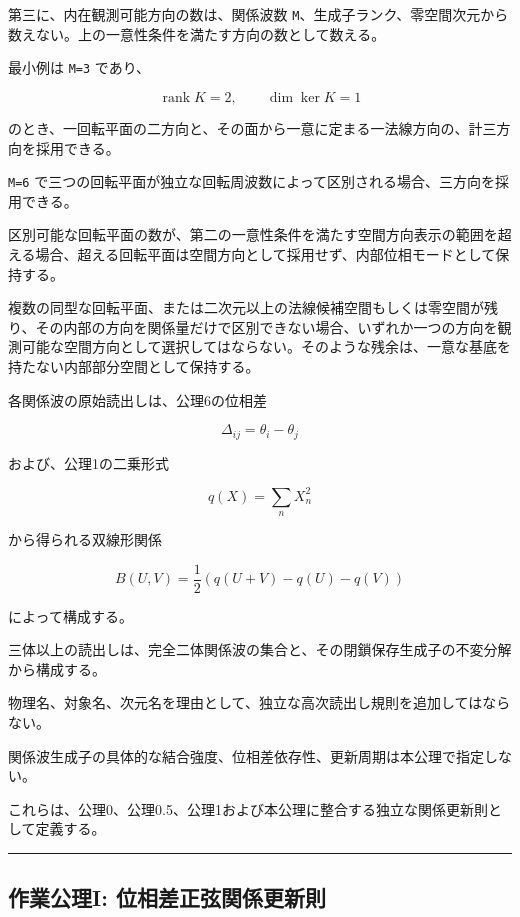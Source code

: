 \documentclass[
  a4paper,
]{ltjsarticle}
\begin{document}
第三に、内在観測可能方向の数は、関係波数
\texttt{M}、生成子ランク、零空間次元から数えない。上の一意性条件を満たす方向の数として数える。

最小例は \texttt{M=3} であり、

\[
\operatorname{rank}K=2,
\qquad
\dim\ker K=1
\]

のとき、一回転平面の二方向と、その面から一意に定まる一法線方向の、計三方向を採用できる。

\texttt{M=6}
で三つの回転平面が独立な回転周波数によって区別される場合、三方向を採用できる。

区別可能な回転平面の数が、第二の一意性条件を満たす空間方向表示の範囲を超える場合、超える回転平面は空間方向として採用せず、内部位相モードとして保持する。

複数の同型な回転平面、または二次元以上の法線候補空間もしくは零空間が残り、その内部の方向を関係量だけで区別できない場合、いずれか一つの方向を観測可能な空間方向として選択してはならない。そのような残余は、一意な基底を持たない内部部分空間として保持する。

各関係波の原始読出しは、公理6の位相差

\[
\Delta_{ij}=\theta_i-\theta_j
\]

および、公理1の二乗形式

\[
q(X)=\sum_n X_n^2
\]

から得られる双線形関係

\[
B(U,V)
=\frac{1}{2}\left(q(U+V)-q(U)-q(V)\right)
\]

によって構成する。

三体以上の読出しは、完全二体関係波の集合と、その閉鎖保存生成子の不変分解から構成する。

物理名、対象名、次元名を理由として、独立な高次読出し規則を追加してはならない。

関係波生成子の具体的な結合強度、位相差依存性、更新周期は本公理で指定しない。

これらは、公理0、公理0.5、公理1および本公理に整合する独立な関係更新則として定義する。

\begin{center}\rule{0.5\linewidth}{0.5pt}\end{center}

\subsection{作業公理I:
位相差正弦関係更新則}\label{ux4f5cux696dux516cux7406i-ux4f4dux76f8ux5deeux6b63ux5f26ux95a2ux4fc2ux66f4ux65b0ux5247}
\end{document}
